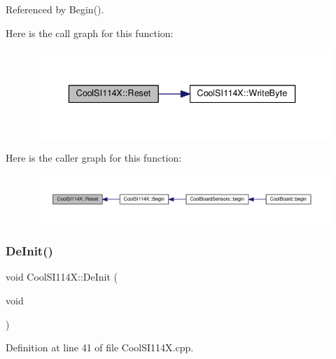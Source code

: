 Referenced by Begin().

Here is the call graph for this function\+:
\nopagebreak
\begin{figure}[H]
\begin{center}
\leavevmode
\includegraphics[width=336pt]{dd/d67/class_cool_s_i114_x_a9d9f9c9129c0c29ed497f8563f3dd823_cgraph}
\end{center}
\end{figure}
Here is the caller graph for this function\+:
\nopagebreak
\begin{figure}[H]
\begin{center}
\leavevmode
\includegraphics[width=350pt]{dd/d67/class_cool_s_i114_x_a9d9f9c9129c0c29ed497f8563f3dd823_icgraph}
\end{center}
\end{figure}
\mbox{\label{class_cool_s_i114_x_a6840abd53a2e3d71a6bb918077c6d6e6}} 
\subsubsection{\texorpdfstring{De\+Init()}{DeInit()}}
{\footnotesize\ttfamily void Cool\+S\+I114\+X\+::\+De\+Init (\begin{DoxyParamCaption}\item[{void}]{ }\end{DoxyParamCaption})}



Definition at line 41 of file Cool\+S\+I114\+X.\+cpp.



